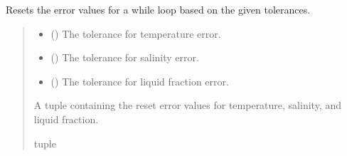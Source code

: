 \documentclass[a4paper,11pt,english,openany]{sphinxmanual}
\begin{document}

\begin{fulllineitems}
\label{\detokenize{api/spyice.statevariables:spyice.statevariables.reset_error_for_while_loop}}
\pysigstartsignatures
{}
\pysigstopsignatures
\sphinxAtStartPar
Resets the error values for a while loop based on the given tolerances.
\begin{quote}\begin{description}
\begin{itemize}
\item {} 
\sphinxAtStartPar
{} () \textendash{} The tolerance for temperature error.

\item {} 
\sphinxAtStartPar
{} () \textendash{} The tolerance for salinity error.

\item {} 
\sphinxAtStartPar
{} () \textendash{} The tolerance for liquid fraction error.

\end{itemize}

\sphinxAtStartPar
A tuple containing the reset error values for temperature, salinity, and liquid fraction.

\sphinxAtStartPar
tuple

\end{description}\end{quote}

\end{fulllineitems}

\end{document}

